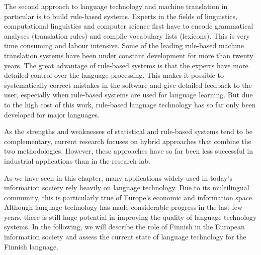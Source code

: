 \begin{multicols}{2}
The second approach to language technology and machine translation in particular is to build rule-based systems. Experts in the fields of linguistics, computational linguistics and computer science first have to encode grammatical analyses (translation rules) and compile vocabulary lists (lexicons). This is very time consuming and labour intensive. Some of the leading rule-based machine translation systems have been under constant development for more than twenty years. The great advantage of rule-based systems is that the experts have more detailed control over the language processing. This makes it possible to systematically correct mistakes in the software and give detailed feedback to the user, especially when rule-based systems are used for language learning. But due to the high cost of this work, rule-based language technology has so far only been developed for major languages.

As the strengths and weaknesses of statistical and rule-based systems tend to be complementary, current research focuses on hybrid approaches that combine the two methodologies. However, these approaches have so far been less successful in industrial applications than in the research lab.

As we have seen in this chapter, many applications widely used in today’s information society rely heavily on language technology. Due to its multilingual community, this is particularly true of Europe’s economic and information space. Although language technology has made considerable progress in the last few years, there is still huge potential in improving the quality of language technology systems. In the following, we will describe the role of Finnish in the European information society and assess the current state of language technology for the Finnish language.
\end{multicols}

\clearpage
{}

